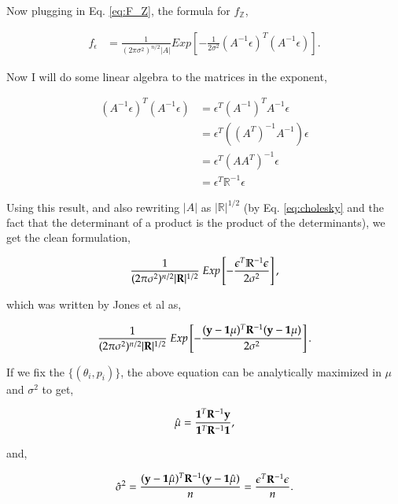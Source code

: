 Now plugging in Eq. \ref{eq:F_Z}, the formula for $f_\mathbb{Z}$, 

\begin{align} \label{eq:getting_F_Y}
f_\epsilon &= \frac{1}{(2\pi\sigma^2)^{n/2}|A|} {E}xp\left [ -\frac{1}{2\sigma^2}(A^{-1}\epsilon)^T(A^{-1}\epsilon)\right ].
\end{align}

Now I will do some linear algebra to the matrices in the exponent,

\begin{align}
(A^{-1}\epsilon)^T(A^{-1}\epsilon) &= \epsilon^T(A^{-1})^TA^{-1}\epsilon \nonumber\\
			 						 &= \epsilon^T((A^T)^{-1}A^{-1})\epsilon\nonumber\\
									 &= \epsilon^T(AA^T)^{-1}\epsilon\nonumber\\
									 &= \epsilon^T\mathbb{R}^{-1}\epsilon
									 \label{eq:inverse}
\end{align}

Using this result, and also rewriting $|A|$ as $|\mathbb{R}|^{1/2}$ (by Eq. \ref{eq:cholesky} and the fact that the determinant of a product is the product of the determinants), we get the clean formulation,

\begin{equation} \label{eq:likelihood1}
\frac{1}
  {(2\pi\sigma^2)^{n/2}|\mb{R}|^{1/2}}\ 
Exp \left 
  [ -\frac
    {\epsilon^T\mathbb{R}^{-1}\epsilon}
    {2\sigma^2} 
\right ],
\end{equation}

which was written by Jones et al as,

\begin{equation} \label{eq:likelihood}
\frac{1}
  {(2\pi\sigma^2)^{n/2}|\mb{R}|^{1/2}}\ 
Exp \left 
  [ -\frac
    {(\mb{y}-\mb{1}\mu)^T\mb{R}^{-1}(\mb{y}-\mb{1}\mu)}
    {2\sigma^2} 
\right ].
\end{equation}

If we fix the $\{(\theta_i,p_i)\}$, the above equation can be analytically maximized in $\mu$ and $\sigma^2$ \citep{jones_efficient_1998} to get,

\begin{equation} \label{eq:mu_hat}
\hat{\mu}=\frac
	{\mathbf{1}^T\mathbf{R}^{-1}\mathbf{y}}
	{\mathbf{1}^T\mathbf{R}^{-1}\mathbf{1}},
\end{equation}


and,

\begin{equation} \label{eq:sig_hat}
\hat{\sigma}^2
    = \frac{(\mathbf{y}-\mathbf{1}\hat{\mu})^T\mathbf{R}^{-1}(\mathbf{y}-\mathbf{1}\hat{\mu})}{n} 
	= \frac{\epsilon^T\mathbf{R}^{-1}\epsilon}{n}.
\end{equation}

